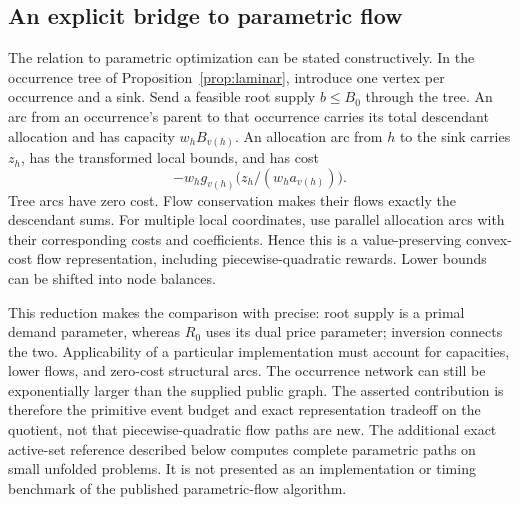 \subsection{An explicit bridge to parametric flow}
The relation to parametric optimization can be stated constructively. In the occurrence tree of Proposition~\ref{prop:laminar}, introduce one vertex per occurrence and a sink. Send a feasible root supply $b\leq B_0$ through the tree. An arc from an occurrence's parent to that occurrence carries its total descendant allocation and has capacity $w_hB_{v(h)}$. An allocation arc from $h$ to the sink carries $z_h$, has the transformed local bounds, and has cost
\[
 -w_h g_{v(h)}\bigl(z_h/(w_ha_{v(h)})\bigr).
\]
Tree arcs have zero cost. Flow conservation makes their flows exactly the descendant sums. For multiple local coordinates, use parallel allocation arcs with their corresponding costs and coefficients. Hence this is a value-preserving convex-cost flow representation, including piecewise-quadratic rewards. Lower bounds can be shifted into node balances.

This reduction makes the comparison with \citet{KlimmWarode2021} precise: root supply is a primal demand parameter, whereas $R_0$ uses its dual price parameter; inversion connects the two. Applicability of a particular implementation must account for capacities, lower flows, and zero-cost structural arcs. The occurrence network can still be exponentially larger than the supplied public graph. The asserted contribution is therefore the primitive event budget and exact representation tradeoff on the quotient, not that piecewise-quadratic flow paths are new. The additional exact active-set reference described below computes complete parametric paths on small unfolded problems. It is not presented as an implementation or timing benchmark of the published parametric-flow algorithm.

